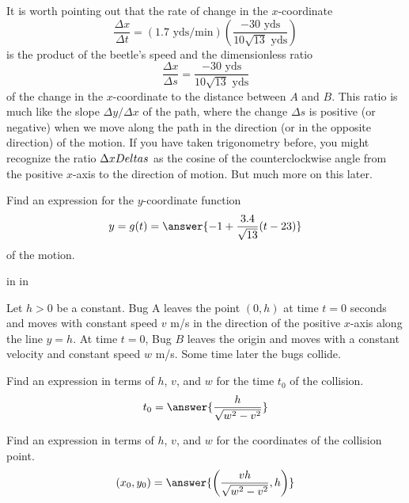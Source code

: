 \documentclass{ximera}
\newcommand{\pskip}{\vskip 0.1 in}
\begin{document}
It is worth pointing out that the rate of change in the $x$-coordinate
\[
    \frac{\Delta x}{\Delta t} = \left( 1.7 \text{ yds/min} \right) \left( \frac{-30 \text{ yds}}{10\sqrt{13} \text{ yds}} \right)
\]
is the product of the beetle's speed and the dimensionless ratio 
\[
     \frac{\Delta x}{\Delta s} = \frac{-30 \text{ yds}}{10\sqrt{13} \text{ yds}}
\]
of the change in the $x$-coordinate to the distance between $A$ and $B$. This ratio is much like the slope $\Delta y / \Delta x$ of the path, where the change $\Delta s$ is positive (or negative) when we move along the path in the direction (or in the opposite direction) of the motion. If you have taken trigonometry before, you might recognize the ratio $\Delta x\/Delta s$ as the cosine of the counterclockwise angle from the positive $x$-axis to the direction of motion. But much more on this later.
 

\begin{question}
 Find an expression for the $y$-coordinate function  
\[
 y = g(t) =   \answer{-1+\frac{3.4}{\sqrt{13}}( t-23)}
\]
of the motion.
    \end{question}


\pskip \pskip


 Let $h>0$ be a constant. Bug A leaves the point $(0,h)$ at time $t=0$ seconds and moves with constant speed $v$ m/s in the direction of the positive $x$-axis along the line $y=h$. At time $t=0$, Bug $B$ leaves the origin and moves with a constant velocity and constant speed $w$ m/s. Some time later the bugs collide.

\begin{question}
 Find an expression in terms of $h$, $v$, and $w$ for the time $t_0$ of the collision.  
\[
        t_0   =  \answer{\frac{h}{\sqrt{w^2-v^2}}}
\]
    \end{question}

\begin{question}
 Find an expression in terms of $h$, $v$, and $w$ for the coordinates of the collision point.  
\[
       (x_0, y_0)  =  \answer{\left( \frac{vh}{\sqrt{w^2-v^2}},h \right)}
\]
    \end{question}
\end{document}

